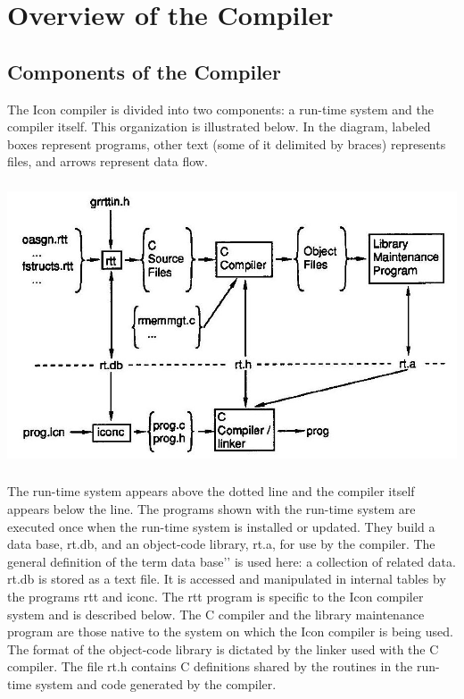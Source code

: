 \chapter{Overview of the Compiler}

\section{Components of the Compiler}

The Icon compiler is divided into two components: a run-time system
and the compiler itself. This organization is illustrated below. In
the diagram, labeled boxes represent programs, other text (some of it
delimited by braces) represents files, and arrows represent data flow.

\noindent\includegraphics[width=6.0in,height=3.3in]{kw/figure5-1.png}

The run-time system appears above the dotted line and the compiler
itself appears below the line. The programs shown with the run-time
system are executed once when the run-time system is installed or
updated. They build a data base, rt.db, and an object-code library,
rt.a, for use by the compiler. The general definition of the term
{\textasciigrave}{\textasciigrave}data base'{}' is used here: a
collection of related data. rt.db is stored as a text file. It is
accessed and manipulated in internal tables by the programs rtt and
iconc. The rtt program is specific to the Icon compiler system and is
described below. The C compiler and the library maintenance program
are those native to the system on which the Icon compiler is being
used. The format of the object-code library is dictated by the linker
used with the C compiler. The file rt.h contains C definitions shared
by the routines in the run-time system and code generated by the
compiler.

